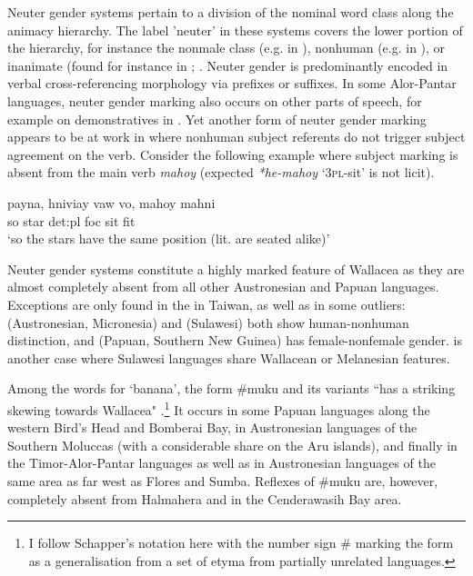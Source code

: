Neuter gender systems pertain to a division of the nominal word class along the animacy hierarchy. The label 'neuter' in these systems covers the lower portion of the hierarchy, for instance the nonmale class (e.g. in ), nonhuman (e.g. in ), or inanimate (found for instance in ; \citealt[128]{schapper2015wallacea}. Neuter gender is predominantly encoded in verbal cross-referencing morphology via prefixes or suffixes. In some Alor-Pantar languages, neuter gender marking also occurs on other parts of speech, for example on demonstratives in . Yet another form of neuter gender marking appears to be at work in  where nonhuman subject referents do not trigger subject agreement on the verb. Consider the following example where subject marking is absent from the main verb \textit{mahoy} (expected \textit{*he-mahoy} `\textsc{3pl}-sit' is not licit).

\ea 
\gll payna, hniviay vaw vo, mahoy mahni \\
so star \acs{det}:\acs{pl} \acs{foc} sit fit \\
\glft `so the stars have the same position
(lit. are seated alike)' \\ 
\z
\xe

Neuter gender systems constitute a highly marked feature of Wallacea as they are almost completely absent from all other Austronesian and Papuan languages. Exceptions are only found in the  in Taiwan, as well as in some outliers:  (Austronesian, Micronesia) and  (Sulawesi) both show human-nonhuman distinction, and  (Papuan, Southern New Guinea) has female-nonfemale gender.  is another case where Sulawesi languages share Wallacean or Melanesian features.

Among the words for `banana', the form \#muku and its variants ``has a striking skewing towards Wallacea" \citep[132]{schapper2015wallacea}.\footnote{I follow Schapper's notation here with the number sign \# marking the form as a generalisation from a set of etyma from partially unrelated languages.} It occurs in some Papuan languages along the western Bird's Head and Bomberai Bay, in Austronesian languages of the Southern Moluccas (with a considerable share on the Aru islands), and finally in the Timor-Alor-Pantar languages as well as in Austronesian languages of the same area as far west as Flores and Sumba. Reflexes of \#muku are, however, completely absent from Halmahera and in the Cenderawasih Bay area.

